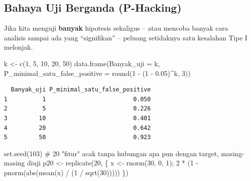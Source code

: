 \documentclass[
  indonesian,
  letterpaper,
]{book}
\newenvironment{Shaded}{\begin{snugshade}}{\end{snugshade}}
\newcommand{\AttributeTok}[1]{\textcolor[rgb]{0.40,0.45,0.13}{#1}}
\newcommand{\CommentTok}[1]{\textcolor[rgb]{0.37,0.37,0.37}{#1}}
\newcommand{\DecValTok}[1]{\textcolor[rgb]{0.68,0.00,0.00}{#1}}
\newcommand{\FloatTok}[1]{\textcolor[rgb]{0.68,0.00,0.00}{#1}}
\newcommand{\FunctionTok}[1]{\textcolor[rgb]{0.28,0.35,0.67}{#1}}
\newcommand{\NormalTok}[1]{\textcolor[rgb]{0.00,0.23,0.31}{#1}}
\newcommand{\OtherTok}[1]{\textcolor[rgb]{0.00,0.23,0.31}{#1}}
\newcommand{\SpecialCharTok}[1]{\textcolor[rgb]{0.37,0.37,0.37}{#1}}
\begin{document}
\subsection{Bahaya Uji Berganda
(P-Hacking)}\label{bahaya-uji-berganda-p-hacking}

Jika kita menguji \textbf{banyak} hipotesis sekaligus -- atau mencoba
banyak cara analisis sampai ada yang ``signifikan'' -- peluang
setidaknya satu kesalahan Tipe I melonjak.

\begin{Shaded}
\begin{Highlighting}[]
\NormalTok{k }\OtherTok{\textless{}{-}} \FunctionTok{c}\NormalTok{(}\DecValTok{1}\NormalTok{, }\DecValTok{5}\NormalTok{, }\DecValTok{10}\NormalTok{, }\DecValTok{20}\NormalTok{, }\DecValTok{50}\NormalTok{)}
\FunctionTok{data.frame}\NormalTok{(}\AttributeTok{Banyak\_uji =}\NormalTok{ k, }\AttributeTok{P\_minimal\_satu\_false\_positive =} \FunctionTok{round}\NormalTok{(}\DecValTok{1} \SpecialCharTok{{-}}\NormalTok{ (}\DecValTok{1} \SpecialCharTok{{-}} \FloatTok{0.05}\NormalTok{)}\SpecialCharTok{\^{}}\NormalTok{k, }\DecValTok{3}\NormalTok{))}
\end{Highlighting}
\end{Shaded}

\begin{verbatim}
  Banyak_uji P_minimal_satu_false_positive
1          1                         0.050
2          5                         0.226
3         10                         0.401
4         20                         0.642
5         50                         0.923
\end{verbatim}

\begin{Shaded}
\begin{Highlighting}[]
\FunctionTok{set.seed}\NormalTok{(}\DecValTok{103}\NormalTok{)}
\CommentTok{\# 20 "fitur" acak tanpa hubungan apa pun dengan target, masing{-}masing diuji}
\NormalTok{p20 }\OtherTok{\textless{}{-}} \FunctionTok{replicate}\NormalTok{(}\DecValTok{20}\NormalTok{, \{ x }\OtherTok{\textless{}{-}} \FunctionTok{rnorm}\NormalTok{(}\DecValTok{30}\NormalTok{, }\DecValTok{0}\NormalTok{, }\DecValTok{1}\NormalTok{); }\DecValTok{2} \SpecialCharTok{*}\NormalTok{ (}\DecValTok{1} \SpecialCharTok{{-}} \FunctionTok{pnorm}\NormalTok{(}\FunctionTok{abs}\NormalTok{(}\FunctionTok{mean}\NormalTok{(x) }\SpecialCharTok{/}\NormalTok{ (}\DecValTok{1} \SpecialCharTok{/} \FunctionTok{sqrt}\NormalTok{(}\DecValTok{30}\NormalTok{))))) \})}
\end{Highlighting}
\end{Shaded}
\end{document}
